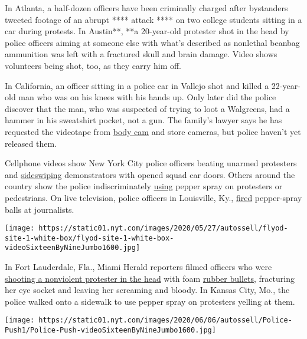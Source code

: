 In Atlanta, a half-dozen officers have been criminally charged after
bystanders tweeted footage of an abrupt **** attack **** on two college
students sitting in a car during protests. In Austin**, **a 20-year-old
protester shot in the head by police officers aiming at someone else
with what's described as nonlethal beanbag ammunition was left with a
fractured skull and brain damage. Video shows volunteers being shot,
too, as they carry him off.

In California, an officer sitting in a police car in Vallejo shot and
killed a 22-year-old man who was on his knees with his hands up. Only
later did the police discover that the man, who was suspected of trying
to loot a Walgreens, had a hammer in his sweatshirt pocket, not a gun.
The family's lawyer says he has requested the videotape from
\href{https://www.nytimes.com/2020/07/08/us/george-floyd-body-camera-transcripts.html}{body
cam} and store cameras, but police haven't yet released them.

Cellphone videos show New York City police officers beating unarmed
protesters and
\href{https://nyc.streetsblog.org/2020/05/30/nypd-out-of-control-videos-depict-cops-on-rampages-across-city/}{sideswiping}
demonstrators with opened squad car doors. Others around the country
show the police indiscriminately
\href{https://www.cleveland.com/crime/2020/06/video-photo-show-cleveland-police-pepper-spraying-shooting-projectiles-at-legal-observers-during-george-floyd-protests.html}{using}
pepper spray on protesters or pedestrians. On live television, police
officers in Louisville, Ky.,
\href{https://www.wave3.com/2020/05/29/lmpd-officer-fires-pepper-balls-wave-news-reporter-photographer-during-louisville-protest/}{fired}
pepper-spray balls at journalists.

\texttt{[image: https://static01.nyt.com/images/2020/05/27/autossell/flyod-site-1-white-box/flyod-site-1-white-box-videoSixteenByNineJumbo1600.jpg]}

In Fort Lauderdale, Fla., Miami Herald reporters filmed officers who
were
\href{https://www.miamiherald.com/news/local/community/broward/article243193481.html}{shooting
a nonviolent protester in the head} with foam
\href{https://www.nytimes.com/2020/06/12/health/protests-rubber-bullets-beanbag.html}{rubber
bullets}, fracturing her eye socket and leaving her screaming and
bloody. In Kansas City, Mo., the police walked onto a sidewalk to use
pepper spray on protesters yelling at them.

\texttt{[image: https://static01.nyt.com/images/2020/06/06/autossell/Police-Push1/Police-Push-videoSixteenByNineJumbo1600.jpg]}

